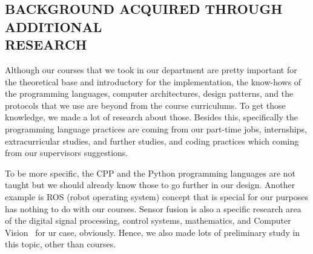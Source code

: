 \documentclass[12pt]{article}
\begin{document}
    \subsection{BACKGROUND ACQUIRED THROUGH ADDITIONAL\\ RESEARCH}

    Although our courses that we took in our department are pretty important for the theoretical base and introductory for the implementation, the know-hows of the programming languages, computer architectures, design patterns, and the protocols that we use are beyond from the course curriculums. To get those knowledge, we made a lot of research about those. Besides this, specifically the programming language practices are coming from our part-time jobs, internships, extracurricular studies, and further studies, and coding practices which coming from our supervisors suggestions.

    To be more specific, the CPP and the Python programming languages are not taught but we should already know those to go further in our design. Another example is ROS (robot operating system) concept that is special for our purposes has nothing to do with our courses. Sensor fusion is also a specific research area of the digital signal processing, control systems, mathematics, and Computer Vision~\cite{enwiki:1120271364} for ur case, obviously. Hence, we also made lots of preliminary study in this topic, other than courses.
    


\end{document}

